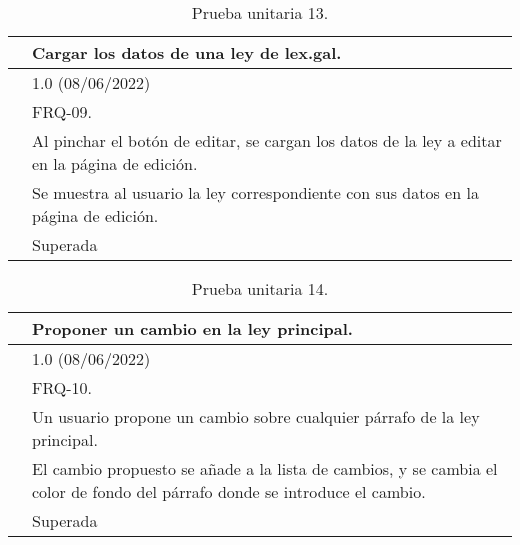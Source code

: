 \begin{table}[H]
\begin{center}
\begin{tabular}{|p{3cm}|p{10cm}|} \hline
\centering {\bf PU-13} & Cargar los datos de una ley de lex.gal.  \\ \hline\hline
\centering {\bf Versión} & 1.0 (08/06/2022) \\ \hline
\centering {\bf Dependencias} & FRQ-09. \\ \hline
\centering {\bf Descripción} &  Al pinchar el botón de editar, se cargan los datos de la ley a editar en la página de edición. \\ \hline
\centering {\bf Criterio de aceptación} & Se muestra al usuario la ley correspondiente con sus datos en la página de edición. \\ \hline
\centering {\bf Estado} & Superada \\ \hline
\end{tabular}
\caption{Prueba unitaria 13.}
\label{enlacePU13}
\end{center}
\end{table}

\begin{table}[H]
\begin{center}
\begin{tabular}{|p{3cm}|p{10cm}|} \hline
\centering {\bf PU-14} & Proponer un cambio en la ley principal.  \\ \hline\hline
\centering {\bf Versión} & 1.0 (08/06/2022) \\ \hline
\centering {\bf Dependencias} & FRQ-10. \\ \hline
\centering {\bf Descripción} &  Un usuario propone un cambio sobre cualquier párrafo de la ley principal. \\ \hline
\centering {\bf Criterio de aceptación} & El cambio propuesto se añade a la lista de cambios, y se cambia el color de fondo del párrafo donde se introduce el cambio. \\ \hline
\centering {\bf Estado} & Superada \\ \hline
\end{tabular}
\caption{Prueba unitaria 14.}
\label{enlacePU14}
\end{center}
\end{table}

